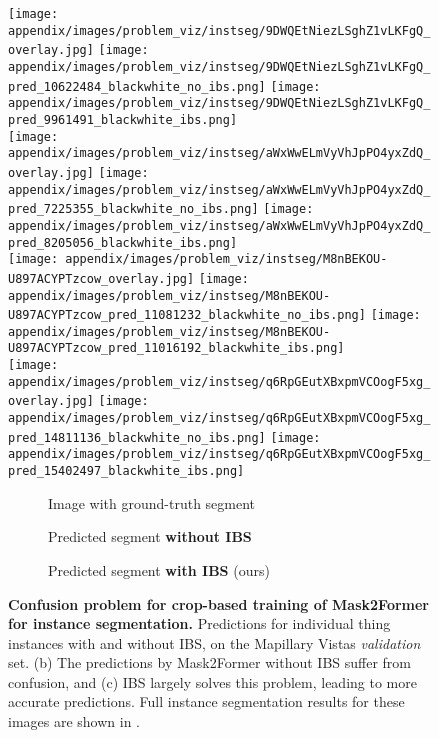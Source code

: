 \documentclass[10pt,twocolumn,letterpaper]{article}
\begin{document}
\begin{figure*}[t]
\centering
\texttt{[image: appendix/images/problem\_viz/instseg/9DWQEtNiezLSghZ1vLKFgQ\_overlay.jpg]}
\texttt{[image: appendix/images/problem\_viz/instseg/9DWQEtNiezLSghZ1vLKFgQ\_pred\_10622484\_blackwhite\_no\_ibs.png]}
\texttt{[image: appendix/images/problem\_viz/instseg/9DWQEtNiezLSghZ1vLKFgQ\_pred\_9961491\_blackwhite\_ibs.png]}\\

\texttt{[image: appendix/images/problem\_viz/instseg/aWxWwELmVyVhJpPO4yxZdQ\_overlay.jpg]}
\texttt{[image: appendix/images/problem\_viz/instseg/aWxWwELmVyVhJpPO4yxZdQ\_pred\_7225355\_blackwhite\_no\_ibs.png]}
\texttt{[image: appendix/images/problem\_viz/instseg/aWxWwELmVyVhJpPO4yxZdQ\_pred\_8205056\_blackwhite\_ibs.png]}\\

\texttt{[image: appendix/images/problem\_viz/instseg/M8nBEKOU-U897ACYPTzcow\_overlay.jpg]}
\texttt{[image: appendix/images/problem\_viz/instseg/M8nBEKOU-U897ACYPTzcow\_pred\_11081232\_blackwhite\_no\_ibs.png]}
\texttt{[image: appendix/images/problem\_viz/instseg/M8nBEKOU-U897ACYPTzcow\_pred\_11016192\_blackwhite\_ibs.png]}\\

\texttt{[image: appendix/images/problem\_viz/instseg/q6RpGEutXBxpmVCOogF5xg\_overlay.jpg]}
\texttt{[image: appendix/images/problem\_viz/instseg/q6RpGEutXBxpmVCOogF5xg\_pred\_14811136\_blackwhite\_no\_ibs.png]}
\texttt{[image: appendix/images/problem\_viz/instseg/q6RpGEutXBxpmVCOogF5xg\_pred\_15402497\_blackwhite\_ibs.png]}\\


 \begin{subfigure}[b]{0.28\textwidth}
     \centering
     \caption{Image with ground-truth segment}
 \end{subfigure}
 \begin{subfigure}[b]{0.28\textwidth}
     \centering
     \caption{Predicted segment \textbf{without IBS}}
 \end{subfigure}
  \begin{subfigure}[b]{0.28\textwidth}
     \centering
     \caption{Predicted segment \textbf{with IBS} (ours)}
 \end{subfigure}

\vspace{-10pt}
\caption{\textbf{Confusion problem for crop-based training of Mask2Former for instance segmentation.} Predictions for individual thing instances with and without IBS, on the Mapillary Vistas \textit{validation} set. (b) The predictions by Mask2Former without IBS suffer from confusion, and (c) IBS largely solves this problem, leading to more accurate predictions. Full instance segmentation results for these images are shown in .}
\label{fig:results_m2f_inst_seg_problem}
\end{figure*} 
\end{document}
